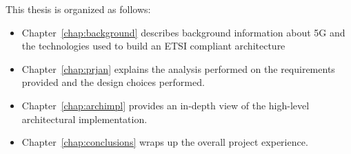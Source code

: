  This thesis is organized as follows:
 \begin{itemize}
  \item Chapter~\ref{chap:background} describes background information about 5G 
and the technologies used to build an ETSI compliant architecture
  \item Chapter~\ref{chap:prjan} explains the analysis performed on the 
requirements provided and the design choices performed.
  \item Chapter~\ref{chap:archimpl} provides an in-depth view of the 
high-level architectural implementation.
  \item Chapter~\ref{chap:conclusions} wraps up the overall project experience.
 \end{itemize}
